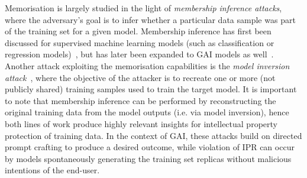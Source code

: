 \documentclass[conference,table]{IEEEtran} %
\begin{document}
Memorisation is largely studied in the light of \textit{membership inference attacks}, where the adversary's goal is to infer whether a particular data sample was part of the training set for a given model. Membership inference has first been discussed for supervised machine learning models (such as classification or regression models)~\cite{shokri_membership_2017}, but has later been expanded to GAI models as well~\cite{webster_this_2021,hu_membership_2023,matsumoto_membership_2023}.
Another attack exploiting the memorisation capabilities is the \textit{model inversion attack}~\cite{fredrikson_model_2015}, where the objective of the attacker is to recreate one or more (not publicly shared) training samples used to train the target model\cite{yin_dreaming_2020,ghiasi_plug-inversion_2022,carlini_extracting_2023}. 
It is important to note that membership inference can be performed by reconstructing the original training data from the model outputs (i.e. via model inversion), hence both lines of work produce highly relevant insights for intellectual property protection of training data.
In the context of GAI, these attacks build on directed prompt crafting to produce a desired outcome, while violation of IPR can occur by models spontaneously generating the training set replicas without malicious intentions of the end-user.
\end{document}
